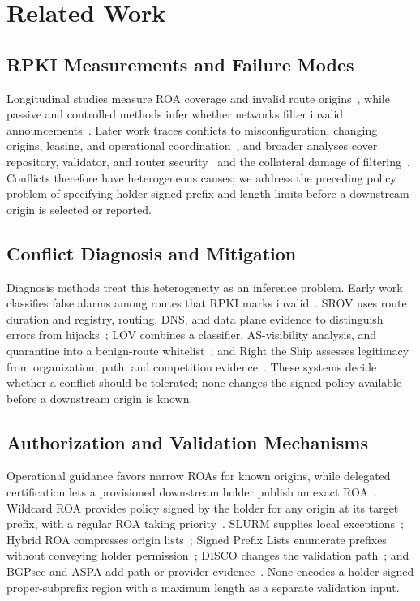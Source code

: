 \section{Related Work}
\label{sec:related_work}

\subsection{RPKI Measurements and Failure Modes}

Longitudinal studies measure ROA coverage and invalid route origins~\cite{chung2019}, while passive and controlled methods infer whether networks filter invalid announcements~\cite{gilad2017rpki,hlavacek2023}. Later work traces conflicts to misconfiguration, changing origins, leasing, and operational coordination~\cite{demystifying2026,leasing2026}, and broader analyses cover repository, validator, and router security~\cite{sok2025} and the collateral damage of filtering~\cite{improv2025}. Conflicts therefore have heterogeneous causes; we address the preceding policy problem of specifying holder-signed prefix and length limits before a downstream origin is selected or reported.

\subsection{Conflict Diagnosis and Mitigation}

Diagnosis methods treat this heterogeneity as an inference problem. Early work classifies false alarms among routes that RPKI marks invalid~\cite{xu2019falsealarm}. SROV uses route duration and registry, routing, DNS, and data plane evidence to distinguish errors from hijacks~\cite{srov2022}; LOV combines a classifier, AS-visibility analysis, and quarantine into a benign-route whitelist~\cite{schulmann2025learning}; and Right the Ship assesses legitimacy from organization, path, and competition evidence~\cite{righttheship2025}. These systems decide whether a conflict should be tolerated; none changes the signed policy available before a downstream origin is known.

\subsection{Authorization and Validation Mechanisms}

Operational guidance favors narrow ROAs for known origins, while delegated certification lets a provisioned downstream holder publish an exact ROA~\cite{rfc7115,rfc9319,rfc6480,rfc6487,rfc9582}. Wildcard ROA provides policy signed by the holder for any origin at its target prefix, with a regular ROA taking priority~\cite{gilad2017rpki}. SLURM supplies local exceptions~\cite{rfc8416}; Hybrid ROA compresses origin lists~\cite{hybridroa2024}; Signed Prefix Lists enumerate prefixes without conveying holder permission~\cite{rpki-spl2025}; DISCO changes the validation path~\cite{disco2020}; and BGPsec and ASPA add path or provider evidence~\cite{rfc8205,aspa-profile2026}. None encodes a holder-signed proper-subprefix region with a maximum length as a separate validation input.
